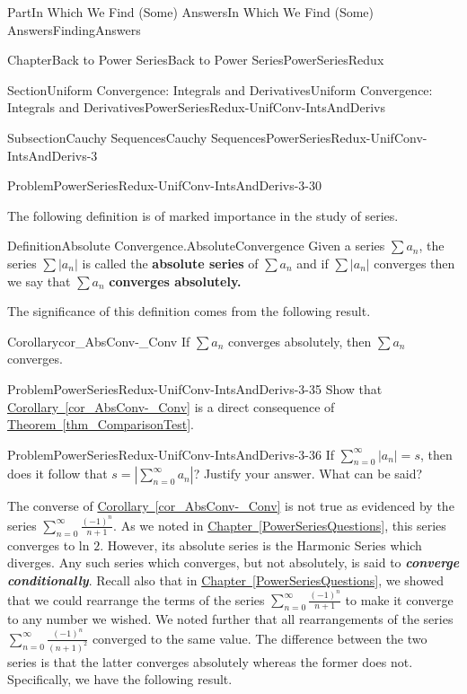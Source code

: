 \documentclass[oneside,10pt,]{book}
\newcommand{\xreffont}{\relax}
\newcommand{\alert}[1]{\textbf{\textit{#1}}}
\newcommand{\terminology}[1]{\textbf{#1}}
\numberwithin{equation}{part}
\begin{document}
\begin{partptx}{Part}{In Which We Find (Some) Answers}{}{In Which We Find (Some) Answers}{}{}{FindingAnswers}
\begin{chapterptx}{Chapter}{Back to Power Series}{}{Back to Power Series}{}{}{PowerSeriesRedux}
\begin{sectionptx}{Section}{Uniform Convergence: Integrals and Derivatives}{}{Uniform Convergence: Integrals and Derivatives}{}{}{PowerSeriesRedux-UnifConv-IntsAndDerivs}
\begin{subsectionptx}{Subsection}{Cauchy Sequences}{}{Cauchy Sequences}{}{}{PowerSeriesRedux-UnifConv-IntsAndDerivs-3}
\begin{problem}{Problem}{}{PowerSeriesRedux-UnifConv-IntsAndDerivs-3-30}
\end{problem}
The following definition is of marked importance in the study of series.%
\begin{definition}{Definition}{Absolute Convergence.}{AbsoluteConvergence}%
%
 Given a series \(\sum a_n\), the series \(\sum|a_n|\) is called the \terminology{absolute series} of \(\sum a_{n}\) and if \(\sum|a_n|\) converges then we say that \(\sum a_{n}\) \terminology{converges absolutely.}%
\end{definition}
The significance of this definition comes from the following result.%
\begin{corollary}{Corollary}{}{}{cor_AbsConv-_Conv}%
If \(\sum a_n\) converges absolutely, then \(\sum a_n\) converges.%
\end{corollary}
\begin{problem}{Problem}{}{PowerSeriesRedux-UnifConv-IntsAndDerivs-3-35}%
 Show that \hyperref[cor_AbsConv-_Conv]{Corollary~{\xreffont\ref{cor_AbsConv-_Conv}}} is a direct consequence of \hyperref[thm_ComparisonTest]{Theorem~{\xreffont\ref{thm_ComparisonTest}}}.%
\end{problem}
\begin{problem}{Problem}{}{PowerSeriesRedux-UnifConv-IntsAndDerivs-3-36}%
 If \(\sum_{n=0}^\infty|a_n|=s\), then does it follow that \(s=|\sum_{n=0}^\infty a_n|\)?  Justify your answer. What can be said?%
\end{problem}
The converse of \hyperref[cor_AbsConv-_Conv]{Corollary~{\xreffont\ref{cor_AbsConv-_Conv}}} is not true as evidenced by the series \(\sum_{n=0}^\infty\frac{(-1)^n}{n+1}\).  As we noted in \hyperref[PowerSeriesQuestions]{Chapter~{\xreffont\ref{PowerSeriesQuestions}}}, this series converges to ln \(2\).  However, its absolute series is the Harmonic  Series which diverges.  Any such series which converges, but not absolutely, is said to \alert{converge conditionally}. Recall also that in \hyperref[PowerSeriesQuestions]{Chapter~{\xreffont\ref{PowerSeriesQuestions}}}, we showed that we could rearrange the terms of the series \(\sum_{n=0}^\infty\frac{(-1)^n}{n+1}\) to make it converge to any number we wished.  We noted further that all rearrangements of the series \(\sum_{n=0}^\infty\frac{(-1)^n}{\left(n+1\right)^2}\) converged to the same value.  The difference between the two series is that the latter converges absolutely whereas the former does not.  Specifically, we have the following result.%

\end{subsectionptx}
\end{sectionptx}
\end{chapterptx}
\end{partptx}
\end{document}
